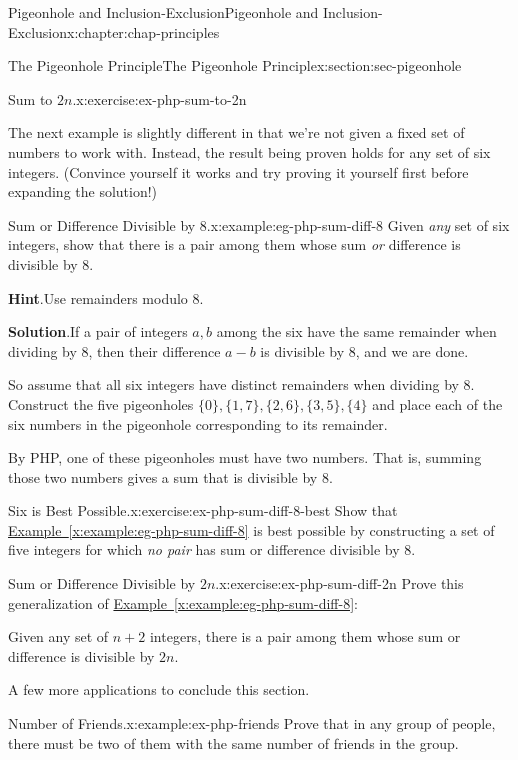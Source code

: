 \documentclass[oneside,10pt,]{book}
\newcommand{\blocktitlefont}{\relax}
\newcommand{\xreffont}{\relax}
\numberwithin{equation}{section}
\begin{document}
\begin{chapterptx}{Pigeonhole and Inclusion-Exclusion}{}{Pigeonhole and Inclusion-Exclusion}{}{}{x:chapter:chap-principles}
\begin{sectionptx}{The Pigeonhole Principle}{}{The Pigeonhole Principle}{}{}{x:section:sec-pigeonhole}
\begin{inlineexercise}{Sum to \(2n\).}{x:exercise:ex-php-sum-to-2n}
\end{inlineexercise}
The next example is slightly different in that we're not given a fixed set of numbers to work with. Instead, the result being proven holds for any set of six integers. (Convince yourself it works and try proving it yourself first before expanding the solution!)%
\begin{example}{Sum or Difference Divisible by 8.}{x:example:eg-php-sum-diff-8}%
Given \emph{any} set of six integers, show that there is a pair among them whose sum \emph{or} difference is divisible by 8.%
\par\smallskip%
\noindent\textbf{\blocktitlefont Hint}.\hypertarget{g:hint:id440999}{}\quad{}Use remainders modulo 8.%
\par\smallskip%
\noindent\textbf{\blocktitlefont Solution}.\hypertarget{g:solution:id440983}{}\quad{}If a pair of integers \(a, b\) among the six have the same remainder when dividing by 8, then their difference \(a-b\) is divisible by 8, and we are done.%
\par
So assume that all six integers have distinct remainders when dividing by 8. Construct the five pigeonholes \(\{0\},\{1,7\},\{2,6\},\{3,5\},\{4\}\) and place each of the six numbers in the pigeonhole corresponding to its remainder.%
\par
By PHP, one of these pigeonholes must have two numbers. That is, summing those two numbers gives a sum that is divisible by 8.%
\end{example}
\begin{inlineexercise}{Six is Best Possible.}{x:exercise:ex-php-sum-diff-8-best}%
Show that \hyperref[x:example:eg-php-sum-diff-8]{Example~{\xreffont\ref{x:example:eg-php-sum-diff-8}}} is best possible by constructing a set of five integers for which \emph{no pair} has sum or difference divisible by 8.%
\end{inlineexercise}
\begin{inlineexercise}{Sum or Difference Divisible by \(2n\).}{x:exercise:ex-php-sum-diff-2n}%
Prove this generalization of \hyperref[x:example:eg-php-sum-diff-8]{Example~{\xreffont\ref{x:example:eg-php-sum-diff-8}}}:%
\par
Given any set of \(n+2\) integers, there is a pair among them whose sum or difference is divisible by \(2n\).%
\end{inlineexercise}
A few more applications to conclude this section.%
\begin{example}{Number of Friends.}{x:example:ex-php-friends}%
Prove that in any group of people, there must be two of them with the same number of friends in the group.%

\end{example}
\end{sectionptx}
\end{chapterptx}
\end{document}
